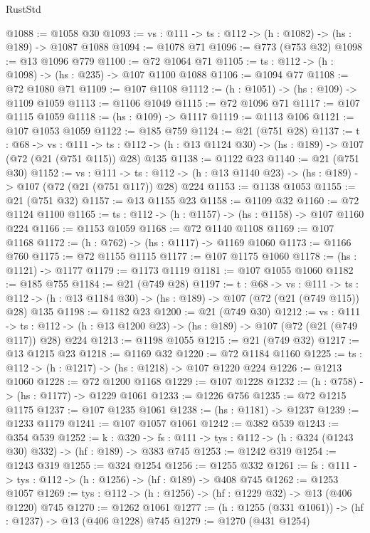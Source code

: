 \begin{lexlean}{RustStd}
\begin{coremodule}
@1088 := @1058 @30
@1093 := {vs : @111} -> {ts : @112} -> (h : @1082) -> (hs : @189) -> @1087 @1088
@1094 := @1078 @71
@1096 := @773 (@753 @32)
@1098 := @13 @1096 @779
@1100 := @72 @1064 @71
@1105 := {ts : @112} -> (h : @1098) -> (hs : @235) -> @107 @1100 @1088
@1106 := @1094 @77
@1108 := @72 @1080 @71
@1109 := @107 @1108
@1112 := (h : @1051) -> (hs : @109) -> @1109 @1059
@1113 := @1106 @1049
@1115 := @72 @1096 @71
@1117 := @107 @1115 @1059
@1118 := (hs : @109) -> @1117
@1119 := @1113 @106
@1121 := @107 @1053 @1059
@1122 := @185 @759
@1124 := @21 (@751 @28)
@1137 := {t : @68} ->
  {vs : @111} ->
  {ts : @112} -> (h : @13 @1124 @30) -> (hs : @189) -> @107 (@72 (@21 (@751 @115)) @28) @135
@1138 := @1122 @23
@1140 := @21 (@751 @30)
@1152 := {vs : @111} ->
  {ts : @112} -> (h : @13 @1140 @23) -> (hs : @189) -> @107 (@72 (@21 (@751 @117)) @28) @224
@1153 := @1138 @1053
@1155 := @21 (@751 @32)
@1157 := @13 @1155 @23
@1158 := @1109 @32
@1160 := @72 @1124 @1100
@1165 := {ts : @112} -> (h : @1157) -> (hs : @1158) -> @107 @1160 @224
@1166 := @1153 @1059
@1168 := @72 @1140 @1108
@1169 := @107 @1168
@1172 := (h : @762) -> (hs : @1117) -> @1169 @1060
@1173 := @1166 @760
@1175 := @72 @1155 @1115
@1177 := @107 @1175 @1060
@1178 := (hs : @1121) -> @1177
@1179 := @1173 @1119
@1181 := @107 @1055 @1060
@1182 := @185 @755
@1184 := @21 (@749 @28)
@1197 := {t : @68} ->
  {vs : @111} ->
  {ts : @112} -> (h : @13 @1184 @30) -> (hs : @189) -> @107 (@72 (@21 (@749 @115)) @28) @135
@1198 := @1182 @23
@1200 := @21 (@749 @30)
@1212 := {vs : @111} ->
  {ts : @112} -> (h : @13 @1200 @23) -> (hs : @189) -> @107 (@72 (@21 (@749 @117)) @28) @224
@1213 := @1198 @1055
@1215 := @21 (@749 @32)
@1217 := @13 @1215 @23
@1218 := @1169 @32
@1220 := @72 @1184 @1160
@1225 := {ts : @112} -> (h : @1217) -> (hs : @1218) -> @107 @1220 @224
@1226 := @1213 @1060
@1228 := @72 @1200 @1168
@1229 := @107 @1228
@1232 := (h : @758) -> (hs : @1177) -> @1229 @1061
@1233 := @1226 @756
@1235 := @72 @1215 @1175
@1237 := @107 @1235 @1061
@1238 := (hs : @1181) -> @1237
@1239 := @1233 @1179
@1241 := @107 @1057 @1061
@1242 := @382 @539
@1243 := @354 @539
@1252 := {k : @320} ->
  {fs : @111} -> {tys : @112} -> (h : @324 (@1243 @30) @332) -> (hf : @189) -> @383 @745
@1253 := @1242 @319
@1254 := @1243 @319
@1255 := @324 @1254
@1256 := @1255 @332
@1261 := {fs : @111} -> {tys : @112} -> (h : @1256) -> (hf : @189) -> @408 @745
@1262 := @1253 @1057
@1269 := {tys : @112} -> (h : @1256) -> (hf : @1229 @32) -> @13 (@406 @1220) @745
@1270 := @1262 @1061
@1277 := (h : @1255 (@331 @1061)) -> (hf : @1237) -> @13 (@406 @1228) @745
@1279 := @1270 (@431 @1254)

\end{coremodule}
\end{lexlean}
